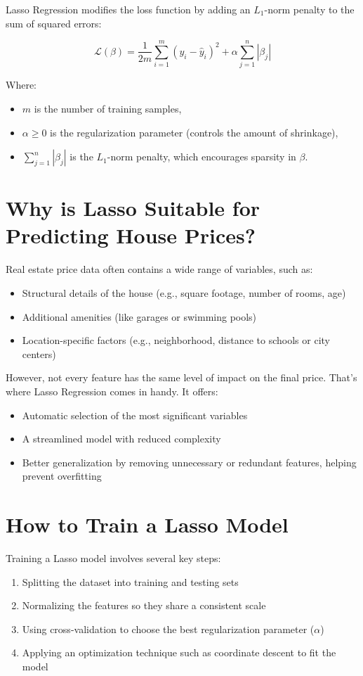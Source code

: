 \documentclass[12pt, a4paper]{report}
\begin{document}
Lasso Regression modifies the loss function by adding an \( L_1 \)-norm penalty to the sum of squared errors:

\[
\mathcal{L}(\beta) = \frac{1}{2m} \sum_{i=1}^{m} (y_i - \hat{y}_i)^2 + \alpha \sum_{j=1}^{n} |\beta_j|
\]

Where:
\begin{itemize}
    \item \( m \) is the number of training samples,
    \item \( \alpha \geq 0 \) is the regularization parameter (controls the amount of shrinkage),
    \item \( \sum_{j=1}^{n} |\beta_j| \) is the \( L_1 \)-norm penalty, which encourages sparsity in \( \beta \).
\end{itemize}

\section{Why is Lasso Suitable for Predicting House Prices?}

Real estate price data often contains a wide range of variables, such as:
\begin{itemize}
    \item Structural details of the house (e.g., square footage, number of rooms, age)
    \item Additional amenities (like garages or swimming pools)
    \item Location-specific factors (e.g., neighborhood, distance to schools or city centers)
\end{itemize}

However, not every feature has the same level of impact on the final price. That’s where Lasso Regression comes in handy. It offers:
\begin{itemize}
    \item Automatic selection of the most significant variables
    \item A streamlined model with reduced complexity
    \item Better generalization by removing unnecessary or redundant features, helping prevent overfitting
\end{itemize}

\section{How to Train a Lasso Model}

Training a Lasso model involves several key steps:
\begin{enumerate}
    \item Splitting the dataset into training and testing sets
    \item Normalizing the features so they share a consistent scale
    \item Using cross-validation to choose the best regularization parameter ($\alpha$)
    \item Applying an optimization technique such as coordinate descent to fit the model
\end{enumerate}
\end{document}
